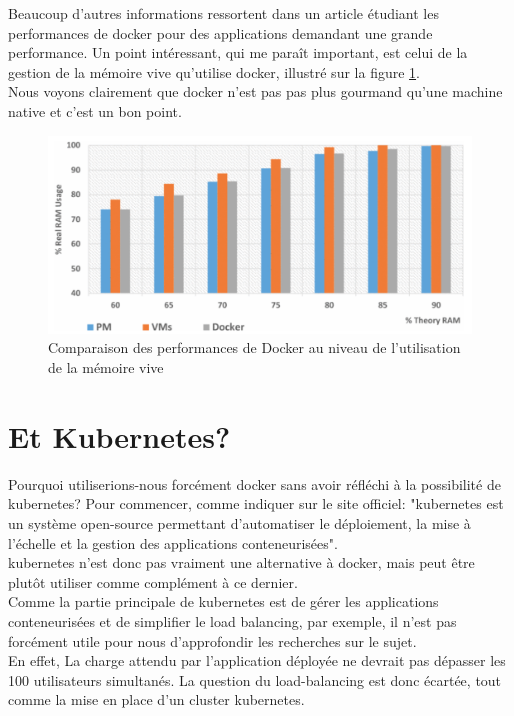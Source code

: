 \documentclass[
    iai, %
    il, %
]{heig-tb}
\begin{document}
Beaucoup d'autres informations ressortent dans un article étudiant les performances de \Gls{docker} pour
des applications demandant une grande performance. \cite{chung}
Un point intéressant, qui me paraît important, est celui de la gestion de la mémoire vive qu'utilise
\Gls{docker}, illustré sur la figure \ref{docker-perf-ram}.\\
Nous voyons clairement que \Gls{docker} n'est pas pas plus gourmand qu'une machine native et c'est un bon point.

\begin{center}
    \begin{figure}
        \includegraphics[width=\textwidth]{./assets/figures/docker-perf-ram.png}
        \caption[Comparaison des perf. Docker sur la RAM]{Comparaison des performances de Docker au
            niveau de l'utilisation de la mémoire vive \cite{chung} \label{docker-perf-ram}}
    \end{figure}
\end{center}


\section{Et Kubernetes?}
Pourquoi utiliserions-nous forcément \Gls{docker} sans avoir réfléchi à la possibilité de \Gls{kubernetes}?
Pour commencer, comme indiquer sur le site officiel:
"\Gls{kubernetes} est un système open-source permettant d'automatiser le déploiement, la mise à l'échelle et la gestion des applications conteneurisées".\\
\Gls{kubernetes} n'est donc pas vraiment une alternative à \Gls{docker}, mais peut être plutôt utiliser comme complément à ce dernier.\\
Comme la partie principale de \Gls{kubernetes} est de gérer les applications conteneurisées et de simplifier le load balancing, par exemple, il n'est pas forcément utile pour nous d'approfondir les recherches sur le sujet.\\
En effet, La charge attendu par l'application déployée ne devrait pas dépasser les 100 utilisateurs simultanés. La question du load-balancing est donc écartée, tout comme la mise en place d'un cluster \Gls{kubernetes}.
\end{document}
